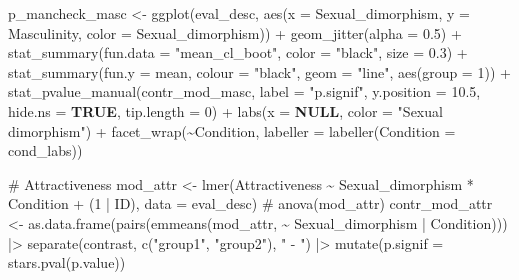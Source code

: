 \documentclass[
  bookmarksnumbered]{article}
\newenvironment{Shaded}{\begin{snugshade}}{\end{snugshade}}
\newcommand{\AttributeTok}[1]{\textcolor[rgb]{0.80,0.80,0.80}{#1}}
\newcommand{\CommentTok}[1]{\textcolor[rgb]{0.50,0.62,0.50}{#1}}
\newcommand{\ConstantTok}[1]{\textcolor[rgb]{0.86,0.64,0.64}{\textbf{#1}}}
\newcommand{\DecValTok}[1]{\textcolor[rgb]{0.86,0.86,0.80}{#1}}
\newcommand{\FloatTok}[1]{\textcolor[rgb]{0.75,0.75,0.82}{#1}}
\newcommand{\FunctionTok}[1]{\textcolor[rgb]{0.94,0.94,0.56}{#1}}
\newcommand{\NormalTok}[1]{\textcolor[rgb]{0.80,0.80,0.80}{#1}}
\newcommand{\OtherTok}[1]{\textcolor[rgb]{0.94,0.94,0.56}{#1}}
\newcommand{\SpecialCharTok}[1]{\textcolor[rgb]{0.86,0.64,0.64}{#1}}
\newcommand{\StringTok}[1]{\textcolor[rgb]{0.80,0.58,0.58}{#1}}
\begin{document}
\begin{Shaded}
\begin{Highlighting}[]
\NormalTok{p\_mancheck\_masc }\OtherTok{\textless{}{-}} \FunctionTok{ggplot}\NormalTok{(eval\_desc, }\FunctionTok{aes}\NormalTok{(}\AttributeTok{x =}\NormalTok{ Sexual\_dimorphism, }\AttributeTok{y =}\NormalTok{ Masculinity, }\AttributeTok{color =}\NormalTok{ Sexual\_dimorphism)) }\SpecialCharTok{+}
  \FunctionTok{geom\_jitter}\NormalTok{(}\AttributeTok{alpha =} \FloatTok{0.5}\NormalTok{) }\SpecialCharTok{+}
  \FunctionTok{stat\_summary}\NormalTok{(}\AttributeTok{fun.data =} \StringTok{"mean\_cl\_boot"}\NormalTok{,}
               \AttributeTok{color =} \StringTok{"black"}\NormalTok{, }
               \AttributeTok{size =} \FloatTok{0.3}\NormalTok{) }\SpecialCharTok{+}
  \FunctionTok{stat\_summary}\NormalTok{(}\AttributeTok{fun.y =}\NormalTok{ mean, }
               \AttributeTok{colour =} \StringTok{"black"}\NormalTok{, }
               \AttributeTok{geom =} \StringTok{"line"}\NormalTok{, }
               \FunctionTok{aes}\NormalTok{(}\AttributeTok{group =} \DecValTok{1}\NormalTok{)) }\SpecialCharTok{+}
  \FunctionTok{stat\_pvalue\_manual}\NormalTok{(contr\_mod\_masc, }\AttributeTok{label =} \StringTok{"p.signif"}\NormalTok{,}
                     \AttributeTok{y.position =} \FloatTok{10.5}\NormalTok{,}
                     \AttributeTok{hide.ns =} \ConstantTok{TRUE}\NormalTok{,}
                     \AttributeTok{tip.length =} \DecValTok{0}\NormalTok{) }\SpecialCharTok{+}
  \FunctionTok{labs}\NormalTok{(}\AttributeTok{x =} \ConstantTok{NULL}\NormalTok{,}
       \AttributeTok{color =} \StringTok{"Sexual dimorphism"}\NormalTok{) }\SpecialCharTok{+}
  \FunctionTok{facet\_wrap}\NormalTok{(}\SpecialCharTok{\textasciitilde{}}\NormalTok{Condition,}
             \AttributeTok{labeller =} \FunctionTok{labeller}\NormalTok{(}\AttributeTok{Condition =}\NormalTok{ cond\_labs))}

\CommentTok{\# Attractiveness}
\NormalTok{mod\_attr }\OtherTok{\textless{}{-}} \FunctionTok{lmer}\NormalTok{(Attractiveness }\SpecialCharTok{\textasciitilde{}}\NormalTok{ Sexual\_dimorphism }\SpecialCharTok{*}\NormalTok{ Condition }\SpecialCharTok{+}\NormalTok{ (}\DecValTok{1} \SpecialCharTok{|}\NormalTok{ ID), }\AttributeTok{data =}\NormalTok{ eval\_desc)}
\CommentTok{\# anova(mod\_attr)}
\NormalTok{contr\_mod\_attr }\OtherTok{\textless{}{-}} \FunctionTok{as.data.frame}\NormalTok{(}\FunctionTok{pairs}\NormalTok{(}\FunctionTok{emmeans}\NormalTok{(mod\_attr,}
                                              \SpecialCharTok{\textasciitilde{}}\NormalTok{ Sexual\_dimorphism }\SpecialCharTok{|}\NormalTok{ Condition))) }\SpecialCharTok{|\textgreater{}} 
  \FunctionTok{separate}\NormalTok{(contrast, }\FunctionTok{c}\NormalTok{(}\StringTok{"group1"}\NormalTok{, }\StringTok{"group2"}\NormalTok{), }\StringTok{" {-} "}\NormalTok{) }\SpecialCharTok{|\textgreater{}} 
  \FunctionTok{mutate}\NormalTok{(}\AttributeTok{p.signif =} \FunctionTok{stars.pval}\NormalTok{(p.value))}


\end{Highlighting}
\end{Shaded}
\end{document}
